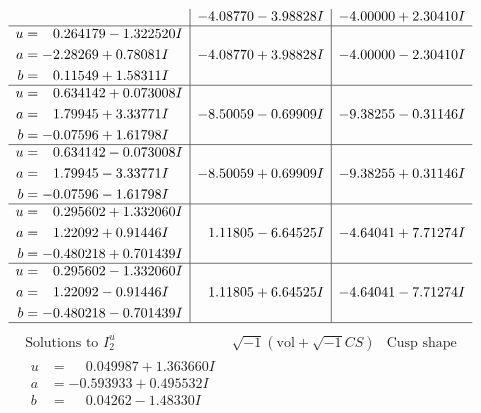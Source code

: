 \documentclass[1p]{elsarticle_modified}
\theoremstyle{definition}
\newcommand{\I}{\sqrt{-1}}
\begin{document}
$$\begin{array}{c|c|c}
 & -4.08770 - 3.98828 I & -4.00000 + 2.30410 I \\ \hline\begin{aligned}
u &= \phantom{-}0.264179 - 1.322520 I \\
a &= -2.28269 + 0.78081 I \\
b &= \phantom{-}0.11549 + 1.58311 I\end{aligned}
 & -4.08770 + 3.98828 I & -4.00000 - 2.30410 I \\ \hline\begin{aligned}
u &= \phantom{-}0.634142 + 0.073008 I \\
a &= \phantom{-}1.79945 + 3.33771 I \\
b &= -0.07596 + 1.61798 I\end{aligned}
 & -8.50059 - 0.69909 I & -9.38255 - 0.31146 I \\ \hline\begin{aligned}
u &= \phantom{-}0.634142 - 0.073008 I \\
a &= \phantom{-}1.79945 - 3.33771 I \\
b &= -0.07596 - 1.61798 I\end{aligned}
 & -8.50059 + 0.69909 I & -9.38255 + 0.31146 I \\ \hline\begin{aligned}
u &= \phantom{-}0.295602 + 1.332060 I \\
a &= \phantom{-}1.22092 + 0.91446 I \\
b &= -0.480218 + 0.701439 I\end{aligned}
 & \phantom{-}1.11805 - 6.64525 I & -4.64041 + 7.71274 I \\ \hline\begin{aligned}
u &= \phantom{-}0.295602 - 1.332060 I \\
a &= \phantom{-}1.22092 - 0.91446 I \\
b &= -0.480218 - 0.701439 I\end{aligned}
 & \phantom{-}1.11805 + 6.64525 I & -4.64041 - 7.71274 I\\
 \hline 
 \end{array}$$\newpage$$\begin{array}{c|c|c}  
\text{Solutions to }I^u_{2}& \I (\text{vol} + \sqrt{-1}CS) & \text{Cusp shape}\\
 \hline 
\begin{aligned}
u &= \phantom{-}0.049987 + 1.363660 I \\
a &= -0.593933 + 0.495532 I \\
b &= \phantom{-}0.04262 - 1.48330 I\end{aligned}

\end{array}$$
\end{document}
